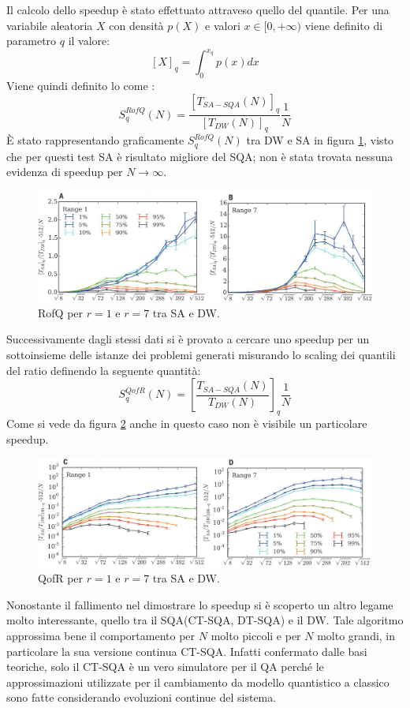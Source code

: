 Il calcolo dello speedup è stato effettuato attraveso quello del quantile. Per una variabile aleatoria $X$ con densità $p(X)$ e valori $x \in [0, +\infty)$ viene definito  di parametro $q$ il valore:
$$[X]_q = \int_0^{x_q} p(x) dx$$
Viene quindi definito lo  come :
$$S_{q}^{RofQ}(N) = \frac{[T_{SA-SQA}(N)]_q}{[T_{DW}(N)]_q}\frac{1}{N}$$
È stato rappresentando graficamente $S_{q}^{RofQ}(N)$ tra DW e SA in figura \ref{figura:RofQ}, visto che per questi test SA è risultato migliore del SQA; non è stata trovata nessuna evidenza di speedup per $N \to \infty$.

\begin{figure}[htbp]
  \centering
  \includegraphics[scale=0.3]{Immagini/RofQ.jpg}
  \caption{RofQ per $r=1$ e $r=7$ tra SA e DW.}
  \label{figura:RofQ}
\end{figure}

Successivamente dagli stessi dati si è provato a cercare uno speedup per un sottoinsieme delle istanze dei problemi generati misurando lo scaling dei quantili del ratio definendo la seguente quantità:
$$S_{q}^{QofR}(N) = \left[\frac{T_{SA-SQA}(N)}{T_{DW}(N)}\right]_q \frac{1}{N}$$
Come si vede da figura \ref{figura:QofR} anche in questo caso non è visibile un particolare speedup.
\begin{figure}[htbp]
  \centering
  \includegraphics[scale=0.3]{Immagini/QofR.jpg}
  \caption{QofR per $r=1$ e $r=7$ tra SA e DW.}
  \label{figura:QofR}
\end{figure}


Nonostante il fallimento nel dimostrare lo speedup si è scoperto un altro legame molto interessante, quello tra il SQA(CT-SQA, DT-SQA) e il DW. Tale algoritmo approssima bene il comportamento per $N$ molto piccoli e per $N$ molto grandi\cite{EQA}, in particolare la sua versione continua CT-SQA\cite{QVC}. Infatti confermato dalle basi teoriche, solo il CT-SQA è un vero simulatore per il QA perché le approssimazioni utilizzate per il cambiamento da modello quantistico a classico sono fatte considerando evoluzioni continue del sistema.

